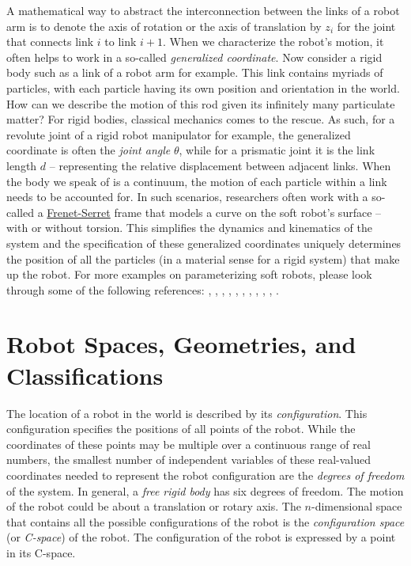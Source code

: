  A mathematical way to abstract the interconnection between the links of a robot arm is to denote the axis of rotation or the axis of translation by $z_i$ for the joint that connects link $i$ to link $i+1$. When we characterize the robot's motion, it often helps to work in a so-called \textit{generalized coordinate}. Now consider a rigid body such as a link of a robot arm for example. This link contains myriads of particles, with each particle having its own position and orientation in the world. How can we describe the motion of this rod given its infinitely many particulate matter? For rigid bodies, classical mechanics comes to the rescue. As such, for a revolute joint of a rigid robot manipulator for example, the generalized coordinate is often the \textit{joint angle} $\theta$, while for a prismatic joint it is the link length $d$ -- representing the relative displacement between adjacent links. When the body we speak of is a continuum, the motion of each particle within a link needs to be accounted for. In such scenarios, researchers often work with a so-called a \href{http://web.mit.edu/hyperbook/Patrikalakis-Maekawa-Cho/node25.html}{Frenet-Serret} frame that models  a curve on the soft robot's surface -- with or without torsion. This simplifies the dynamics and kinematics of the system and the specification of these generalized coordinates uniquely determines the position of all the particles (in a material sense for a rigid system) that make up the robot. For more examples on parameterizing soft robots, please look through some of the following references: \cite{Ogunmolu15CASE}, \cite{Hannan2000} \cite{Ogunmolu16CASE}, \cite{Renda2018ICRA}, \cite{ShepherdMultigait}, \cite{Hannan2003}, \cite{Ogunmolu17IROS}, \cite{Laschi15NeuNet}, \cite{Ogunmolu19RALI}, \cite{Renda2014Cosserat}, \cite{Ogunmolu19RALII}, \cite{OgunmoluThesis}.
% 
 
 \section{Robot Spaces, Geometries, and Classifications}
 
 The location of a robot in the world is described by its \textit{configuration}. This configuration specifies the positions of all points of the robot. While the coordinates of these points may be multiple over a continuous range of real numbers, the smallest number of independent variables of these real-valued coordinates needed to represent the robot configuration are the \textit{degrees of freedom} of the system.  In general, a \textit{free rigid body} has six degrees of freedom. The motion of the robot could be about a translation or rotary axis. The $n$-dimensional space that contains all the possible configurations of the robot is the \textit{configuration space} (or \textit{C-space}) of the robot. The configuration of the robot is expressed by a point in its C-space. 
 
